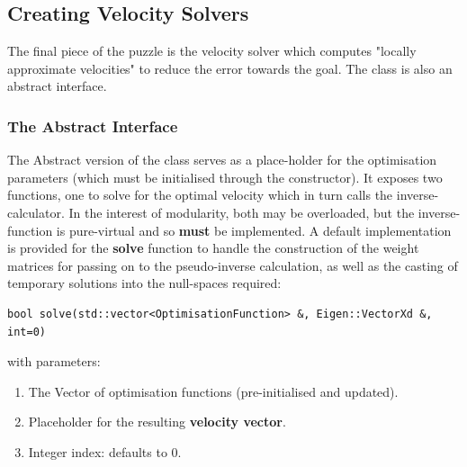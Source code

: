 \documentclass[12pt,a4paper,onecolumn]{article}
\begin{document}
\subsection{Creating Velocity Solvers}
The final piece of the puzzle is the velocity solver which computes "locally approximate velocities" to reduce the error towards the goal. The class is also an abstract interface.
\subsubsection*{The Abstract Interface}
The Abstract version of the class serves as a place-holder for the optimisation parameters (which must be initialised through the constructor). It exposes two functions, one to solve for the optimal velocity which in turn calls the inverse-calculator. In the interest of modularity, both may be overloaded, but the inverse-function is pure-virtual and so \textbf{must} be implemented. A default implementation is provided for the \textbf{solve} function to handle the construction of the weight matrices for passing on to the pseudo-inverse calculation, as well as the casting of temporary solutions into the null-spaces required:
\begin{lstlisting}[belowskip=-1.0 \baselineskip]
bool solve(std::vector<OptimisationFunction> &, Eigen::VectorXd &, int=0)
\end{lstlisting}
with parameters:
\begin{enumerate}
\item The Vector of optimisation functions (pre-initialised and updated).
\item Placeholder for the resulting \textbf{velocity vector}.
\item Integer index: defaults to 0.
\end{enumerate}
\end{document}
